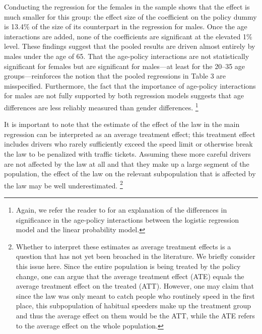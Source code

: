 Conducting the regression for the females in the sample shows that 
the effect is much smaller for this group: 
the effect size of the coefficient on the policy dummy is 13.4\% of the size of its counterpart 
in the regression for males. 
Once the age interactions are added, none of the coefficients are significant at the elevated 1\% level. 
These findings suggest that the pooled results are driven almost entirely by males under the age of 65.
%
That the age-policy interactions are not statistically significant for females 
but are significant for males---at least for the 20--35 age groups---reinforces 
the notion that the pooled regressions in Table 3 are misspecified. 
Furthermore, the fact that the importance of age-policy interactions for males 
are not fully supported by both regression models suggests that 
age differences are less reliably measured than gender differences.%
\footnote{%
% 
Again, we refer the reader to \citet{ainorton2003}
for an explanation of the differences in significance in the age-policy interactions between the logistic regression model and the linear probability model. 
}
%

It is important to note that the estimate of the effect of the law in the main regression 
can be interpreted as an average treatment effect; 
this treatment effect includes drivers who rarely sufficiently exceed the speed limit 
or otherwise break the law to be penalized with traffic tickets. 
Assuming these more careful drivers are not affected by the law at all 
and that they make up a large segment of the population, 
the effect of the law on the relevant subpopulation that is affected by the law 
may be well underestimated.%
\footnote{%
Whether to interpret these estimates as average treatment effects 
is a question that has not yet been broached in the literature. 
We briefly consider this issue here. 
Since the entire population is being treated by the policy change, 
one can argue that the average treatment effect (ATE) equals 
the average treatment effect on the treated (ATT). 
However, one may claim that since the law was only meant to catch people 
who routinely speed in the first place, 
this subpopulation of habitual speeders make up the treatment group 
and thus the average effect on them would be the ATT, 
while the ATE refers to the average effect on the whole population.
}
%


